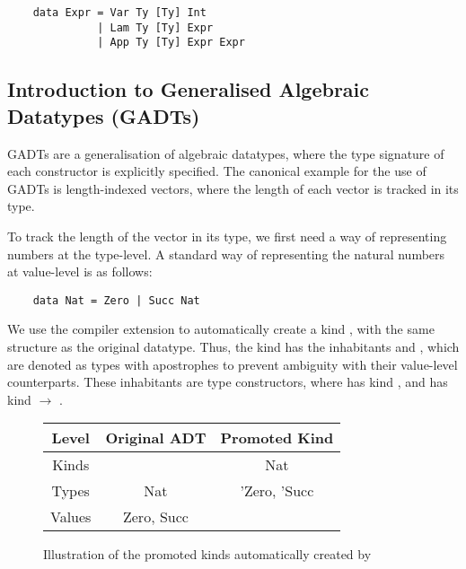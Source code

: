 \begin{lstlisting}
    data Expr = Var Ty [Ty] Int
              | Lam Ty [Ty] Expr
              | App Ty [Ty] Expr Expr
\end{lstlisting}


\subsection{Introduction to Generalised Algebraic Datatypes (GADTs)}

GADTs are a generalisation of algebraic datatypes, where the type signature of each constructor is explicitly specified. The canonical example for the use of GADTs is length-indexed vectors, where the length of each vector is tracked in its type.

To track the length of the vector in its type, we first need a way of representing numbers at the type-level. A standard way of representing the natural numbers at value-level is as follows:

\begin{lstlisting}
    data Nat = Zero | Succ Nat
\end{lstlisting}

We use the  compiler extension to automatically create a kind , with the same structure as the original  datatype. Thus, the  kind has the inhabitants  and , which are denoted as types with apostrophes to prevent ambiguity with their value-level counterparts. These inhabitants are type constructors, where  has kind , and  has kind  $\rightarrow$ . 

\begin{figure}[h]
    \centering
    \begin{tabular}{ |c|c|c| } 
        \hline
        Level & Original ADT & Promoted Kind \\
        \hline 
        Kinds &  & Nat \\
        Types & Nat & 'Zero, 'Succ \\
        Values & Zero, Succ & \\
        \hline
    \end{tabular}
    \caption{Illustration of the promoted kinds automatically created by }
    \label{fig:datakindsPromotion}
\end{figure}

